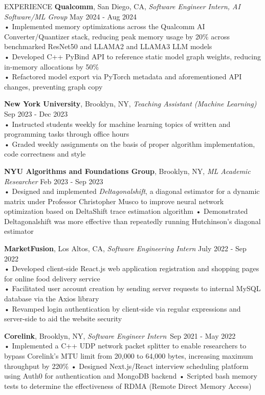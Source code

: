 \documentclass{resume} %
\begin{document}
\begin{rSection}{EXPERIENCE}
\textbf{Qualcomm}, San Diego, CA, {\emph{Software Engineer Intern, AI Software/ML Group}} \hfill May 2024 - Aug 2024 \\ 
• Implemented memory optimizations across the Qualcomm AI Converter/Quantizer stack, reducing peak memory usage by 20\% across benchmarked ResNet50 and LLAMA2 and LLAMA3 LLM models \\
• Developed C++ PyBind API to reference static model graph weights, reducing in-memory allocations by 50\% \\
• Refactored model export via PyTorch metadata and aforementioned API changes, preventing graph copy

\textbf{New York University}, Brooklyn, NY, {\emph{Teaching Assistant (Machine Learning)}} \hfill Sep 2023 - Dec 2023 \\
• Instructed students weekly for machine learning topics of written and programming tasks through office hours \\
• Graded weekly assignments on the basis of proper algorithm implementation, code correctness and style 

\textbf {NYU Algorithms and Foundations Group}, Brooklyn, NY, {\emph{ML Academic Researcher}} \hfill Feb 2023 - Sep 2023 \\
• Designed and implemented \textit{Deltagonalshift}, a diagonal estimator for a dynamic matrix under Professor Christopher Musco to improve neural network optimization based on DeltaShift trace estimation algorithm \newline
• Demonstrated Deltagonalshift was more effective than repeatedly running Hutchinson's diagonal estimator

\textbf{MarketFusion}, Los Altos, CA, {\emph{Software Engineering Intern}} \hfill July 2022 - Sep 2022 \\
• Developed client-side React.js web application registration and shopping pages for online food delivery service \\
• Facilitated user account creation by sending server requests to internal MySQL database via the Axios library \\
• Revamped login authentication by client-side via regular expressions and server-side to aid the website security 

\textbf{Corelink}, Brooklyn, NY, {\emph{Software Engineer Intern}}\ \hfill Sep 2021 - May 2022 \\
• Implemented a C++ UDP network packet splitter to enable researchers to bypass Corelink's MTU limit from 20,000 to 64,000 bytes, increasing maximum throughput by 220\% \newline
• Designed Next.js/React interview scheduling platform using Auth0 for authentication and MongoDB backend \newline
• Scripted bash memory tests to determine the effectiveness of RDMA (Remote Direct Memory Access) 


\end{rSection}
\end{document}
